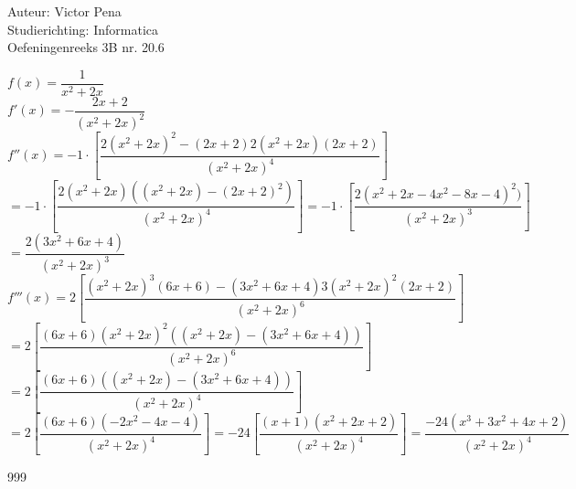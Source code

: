 \documentclass[a4paper]{article}
\begin{document}
	
	\noindent \large Auteur: Victor Pena \\
	\noindent \large Studierichting: Informatica\\
	\noindent \large Oefeningenreeks 3B nr. 20.6\\
	
	\medskip
	
	\normalsize 
	
	$f(x)=\dfrac{1}{x^2+2x}$\\
	
	$f'(x) = -\dfrac{2x+2}{(x^2 +2x)^2}$\\
	
	$f''(x) =  -1\cdot\left[\dfrac{2(x^2+2x)^2-(2x+2)2(x^2+2x)(2x+2)}{(x^2 +2x)^4}\right]$ \\
	
	$=-1\cdot\left[\dfrac{2(x^2+2x)((x^2+2x)-(2x+2)^2)}{(x^2+2x)^4}\right]=-1\cdot\left[\dfrac{2(x^2+2x-4x^2-8x - 4)^2)}{(x^2 +2x)^3}\right]$ \\ 
	
	$=\dfrac{2(3x^2 + 6x +4)}{(x^2 +2x)^3}$ \\
	
	$f'''(x) = 2\left[\dfrac{(x^2+2x)^3(6x+6)-(3x^2+6x+4)3(x^2+2x)^2(2x+2)}{(x^2+2x)^6}\right]$ \\
	
	$=2\left[\dfrac{(6x+6)(x^2+2x)^2((x^2+2x)-(3x^2+6x+4))}{(x^2+2x)^6}\right]$ \\
	
	$=2\left[\dfrac{(6x+6)((x^2+2x)-(3x^2+6x+4))}{(x^2+2x)^4}\right]$ \\
	
	$=2\left[\dfrac{(6x+6)(-2x^2-4x-4)}{(x^2+2x)^4}\right]=-24\left[\dfrac{(x+1)(x^2+2x+2)}{(x^2+2x)^4}\right]=\dfrac{-24(x^3+3x^2+4x+2)}{(x^2+2x)^4}$
	
	
	\begin{thebibliography}{999}
	\end{thebibliography}
\end{document}
